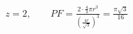\documentclass[preview]{standalone}
\begin{document}
\begin{align*}
z=2,\qquad PF=\frac{2\cdot\frac{4}{3}\pi r^{3}}{\left(\frac{4r}{\sqrt3}\right)^{3}}=\frac{\pi\sqrt3}{16}
\end{align*}
\end{document}

